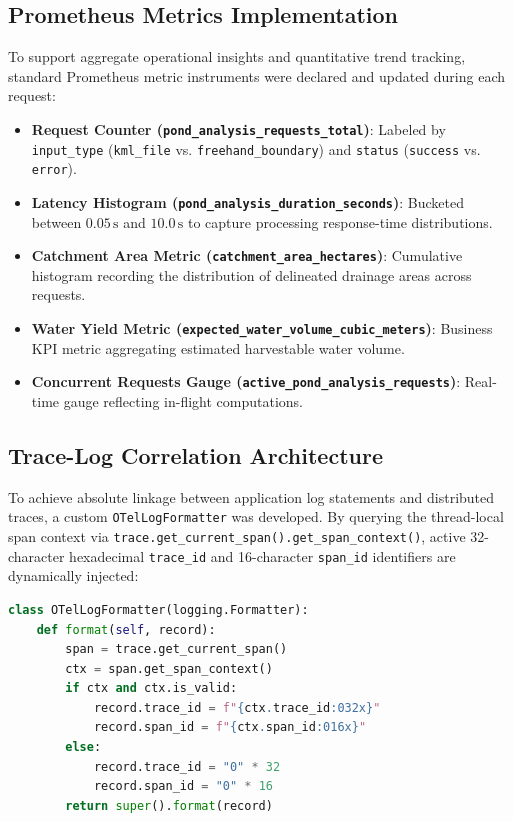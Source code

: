 \documentclass[11pt,a4paper]{article}
\begin{document}
\subsection{Prometheus Metrics Implementation}
To support aggregate operational insights and quantitative trend tracking, standard Prometheus metric instruments were declared and updated during each request:
\begin{itemize}[leftmargin=*]
    \item \textbf{Request Counter (\texttt{pond\_analysis\_requests\_total})}: Labeled by \texttt{input\_type} (\texttt{kml\_file} vs. \texttt{freehand\_boundary}) and \texttt{status} (\texttt{success} vs. \texttt{error}).
    \item \textbf{Latency Histogram (\texttt{pond\_analysis\_duration\_seconds})}: Bucketed between $0.05\,\text{s}$ and $10.0\,\text{s}$ to capture processing response-time distributions.
    \item \textbf{Catchment Area Metric (\texttt{catchment\_area\_hectares})}: Cumulative histogram recording the distribution of delineated drainage areas across requests.
    \item \textbf{Water Yield Metric (\texttt{expected\_water\_volume\_cubic\_meters})}: Business KPI metric aggregating estimated harvestable water volume.
    \item \textbf{Concurrent Requests Gauge (\texttt{active\_pond\_analysis\_requests})}: Real-time gauge reflecting in-flight computations.
\end{itemize}

\subsection{Trace-Log Correlation Architecture}
To achieve absolute linkage between application log statements and distributed traces, a custom \texttt{OTelLogFormatter} was developed. By querying the thread-local span context via \texttt{trace.get\_current\_span().get\_span\_context()}, active 32-character hexadecimal \texttt{trace\_id} and 16-character \texttt{span\_id} identifiers are dynamically injected:
\begin{lstlisting}[language=Python]
class OTelLogFormatter(logging.Formatter):
    def format(self, record):
        span = trace.get_current_span()
        ctx = span.get_span_context()
        if ctx and ctx.is_valid:
            record.trace_id = f"{ctx.trace_id:032x}"
            record.span_id = f"{ctx.span_id:016x}"
        else:
            record.trace_id = "0" * 32
            record.span_id = "0" * 16
        return super().format(record)
\end{lstlisting}
\end{document}
